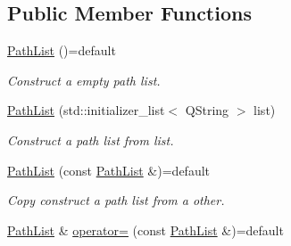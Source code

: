 \subsection*{Public Member Functions}
\begin{DoxyCompactItemize}
\item 
\hyperlink{class_mdt_1_1_file_system_1_1_path_list_a3f7c284afc4e0601dda93ac28b06d3b4}{Path\+List} ()=default\hypertarget{class_mdt_1_1_file_system_1_1_path_list_a3f7c284afc4e0601dda93ac28b06d3b4}{}\label{class_mdt_1_1_file_system_1_1_path_list_a3f7c284afc4e0601dda93ac28b06d3b4}

\begin{DoxyCompactList}\small\item\em Construct a empty path list. \end{DoxyCompactList}\item 
\hyperlink{class_mdt_1_1_file_system_1_1_path_list_aac3c664f86accf87320488af282a7d1b}{Path\+List} (std\+::initializer\+\_\+list$<$ Q\+String $>$ list)\hypertarget{class_mdt_1_1_file_system_1_1_path_list_aac3c664f86accf87320488af282a7d1b}{}\label{class_mdt_1_1_file_system_1_1_path_list_aac3c664f86accf87320488af282a7d1b}

\begin{DoxyCompactList}\small\item\em Construct a path list from {\itshape list}. \end{DoxyCompactList}\item 
\hyperlink{class_mdt_1_1_file_system_1_1_path_list_abb76035e3b9f14ed857038cf1f8a491f}{Path\+List} (const \hyperlink{class_mdt_1_1_file_system_1_1_path_list}{Path\+List} \&)=default\hypertarget{class_mdt_1_1_file_system_1_1_path_list_abb76035e3b9f14ed857038cf1f8a491f}{}\label{class_mdt_1_1_file_system_1_1_path_list_abb76035e3b9f14ed857038cf1f8a491f}

\begin{DoxyCompactList}\small\item\em Copy construct a path list from a other. \end{DoxyCompactList}\item 
\hyperlink{class_mdt_1_1_file_system_1_1_path_list}{Path\+List} \& \hyperlink{class_mdt_1_1_file_system_1_1_path_list_ab22d92660aa04be6e69d0da9d9dbd04b}{operator=} (const \hyperlink{class_mdt_1_1_file_system_1_1_path_list}{Path\+List} \&)=default\hypertarget{class_mdt_1_1_file_system_1_1_path_list_ab22d92660aa04be6e69d0da9d9dbd04b}{}\label{class_mdt_1_1_file_system_1_1_path_list_ab22d92660aa04be6e69d0da9d9dbd04b}


\end{DoxyCompactItemize}
